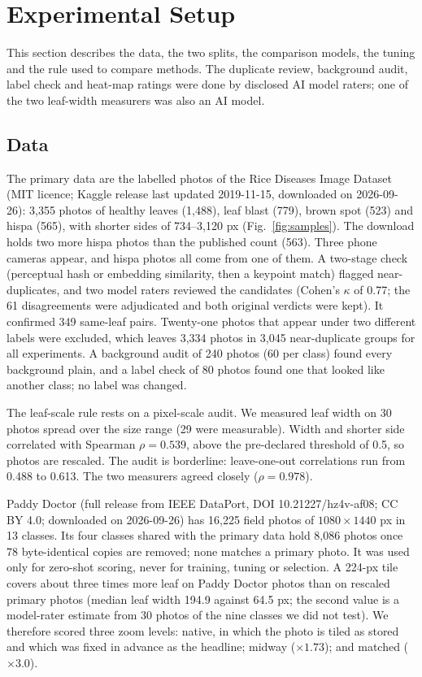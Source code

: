 \section{Experimental Setup}
\label{sec:setup}

This section describes the data, the two splits, the comparison models, the tuning and the rule used to compare methods.
The duplicate review, background audit, label check and heat-map ratings were done by disclosed AI model raters; one of
the two leaf-width measurers was also an AI model.

\subsection{Data}
\label{sec:setup:data}
The primary data are the labelled photos of the Rice Diseases Image Dataset \cite{do2019} (MIT licence; Kaggle release last updated 2019-11-15, downloaded on
2026-09-26): 3{,}355 photos of healthy leaves (1{,}488), leaf blast (779), brown spot (523) and hispa (565), with shorter
sides of 734--3{,}120 px (Fig.~\ref{fig:samples}). The download holds two more hispa photos than the published count (563). Three phone cameras
appear, and hispa photos all come from one of them.
A two-stage check (perceptual hash or embedding similarity, then a keypoint match) flagged near-duplicates, and two model
raters reviewed the candidates (Cohen's $\kappa$ \cite{cohen1960kappa} of 0.77; the 61 disagreements were adjudicated
and both original verdicts were kept). It confirmed 349 same-leaf pairs. Twenty-one photos that appear under
two different labels were excluded, which leaves 3{,}334 photos in 3{,}045 near-duplicate groups for all experiments.
A background audit of 240 photos (60 per class) found every background plain, and a label check of 80 photos
found one that looked like another class; no label was changed.

The leaf-scale rule rests on a pixel-scale audit. We measured leaf width on 30 photos spread over the size range (29 were
measurable). Width and shorter side correlated with Spearman $\rho=0.539$, above the pre-declared threshold of 0.5, so
photos are rescaled. The audit is borderline: leave-one-out correlations run from 0.488 to 0.613. The two measurers
agreed closely ($\rho=0.978$).

Paddy Doctor \cite{petchiammal2023} (full release from IEEE DataPort, DOI 10.21227/hz4v-af08; CC BY 4.0; downloaded on 2026-09-26) has 16{,}225 field photos of $1080\times1440$ px
in 13 classes. Its four classes shared with the primary data hold 8{,}086 photos once 78 byte-identical copies are
removed; none matches a primary photo. It was used only for zero-shot scoring, never for training, tuning or selection. A
224-px tile covers about three times more leaf on Paddy Doctor photos than on rescaled primary photos (median leaf width
194.9 against 64.5 px; the second value is a model-rater estimate from 30 photos of the nine classes we did not test).
We therefore scored three zoom levels: native, in which the photo is tiled as stored and which was fixed in advance as the
headline; midway ($\times1.73$); and matched ($\times3.0$).

